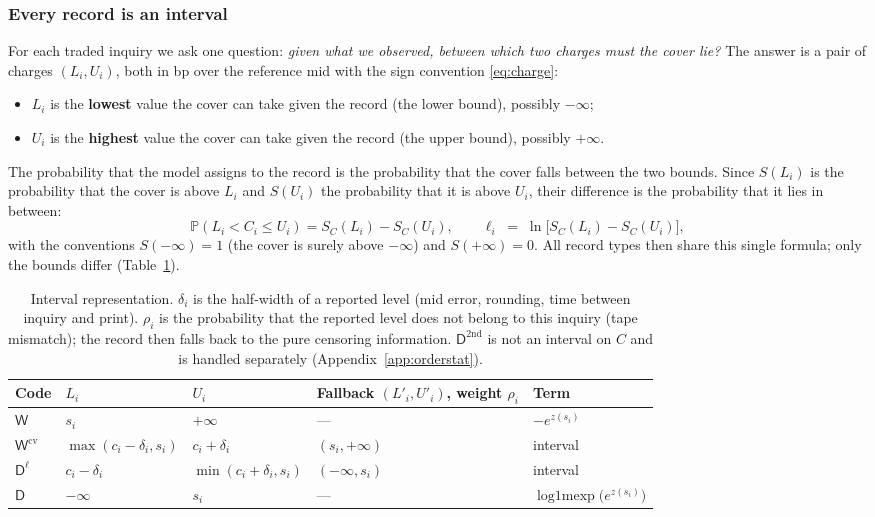 \documentclass[11pt,a4paper]{article}
\theoremstyle{definition}
\theoremstyle{remark}
\newcommand{\Prob}{\mathbb{P}}
\newcommand{\Win}{\mathsf{W}}
\newcommand{\Wc}{\mathsf{W}^{\mathrm{cv}}}
\newcommand{\Dl}{\mathsf{D}^{\ell}}
\newcommand{\Dn}{\mathsf{D}}
\newcommand{\Dcv}{\mathsf{D}^{\mathrm{2nd}}}
\newcommand{\lmexp}{\operatorname{log1mexp}}
\begin{document}
\subsubsection{Every record is an interval}
For each traded inquiry we ask one question: \emph{given what we observed, between which two charges must the cover lie?} The answer is a pair of charges $(L_i,U_i)$, both in bp over the reference mid with the sign convention \eqref{eq:charge}:
\begin{itemize}[itemsep=1pt]
\item $L_i$ is the \textbf{lowest} value the cover can take given the record (the lower bound), possibly $-\infty$;
\item $U_i$ is the \textbf{highest} value the cover can take given the record (the upper bound), possibly $+\infty$.
\end{itemize}
The probability that the model assigns to the record is the probability that the cover falls between the two bounds. Since $S(L_i)$ is the probability that the cover is above $L_i$ and $S(U_i)$ the probability that it is above $U_i$, their difference is the probability that it lies in between:
\begin{equation}\label{eq:unified}
\Prob(L_i<C_i\le U_i)=S_C(L_i)-S_C(U_i),\qquad
\ell_i\;=\;\ln\bigl[S_C(L_i)-S_C(U_i)\bigr],
\end{equation}
with the conventions $S(-\infty)=1$ (the cover is surely above $-\infty$) and $S(+\infty)=0$. All record types then share this single formula; only the bounds differ (Table~\ref{tab:intervals}).
\begin{table}[h]
\centering
\begin{tabular}{lllll}
\toprule
Code & $L_i$ & $U_i$ & Fallback $(L'_i,U'_i)$, weight $\rho_i$ & Term \\
\midrule
$\Win$ & $s_i$ & $+\infty$ & --- & $-e^{z(s_i)}$ \\
$\Wc$ & $\max(c_i-\delta_i,s_i)$ & $c_i+\delta_i$ & $(s_i,+\infty)$ & interval \\
$\Dl$ & $c_i-\delta_i$ & $\min(c_i+\delta_i,s_i)$ & $(-\infty,s_i)$ & interval \\
$\Dn$ & $-\infty$ & $s_i$ & --- & $\lmexp\bigl(e^{z(s_i)}\bigr)$ \\
\bottomrule
\end{tabular}
\caption{Interval representation. $\delta_i$ is the half-width of a reported level (mid error, rounding, time between inquiry and print). $\rho_i$ is the probability that the reported level does not belong to this inquiry (tape mismatch); the record then falls back to the pure censoring information. $\Dcv$ is not an interval on $C$ and is handled separately (Appendix~\ref{app:orderstat}).}
\label{tab:intervals}
\end{table}
\end{document}
